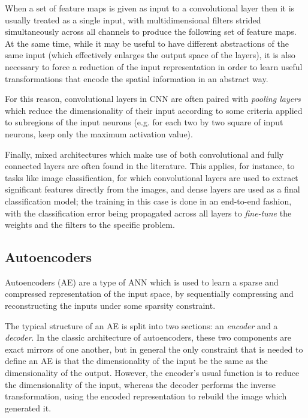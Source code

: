 When a set of feature maps is given as input to a convolutional layer then it is
usually treated as a single input, with multidimensional filters strided 
simultaneously across all channels to produce the following set of feature maps. \\

At the same time, while it may be useful to have different abstractions of the
same input (which effectively enlarges the output space of the layers), it is
also necessary to force a reduction of the input representation in order to 
learn useful transformations that encode the spatial information in an abstract 
way. 

For this reason, convolutional layers in CNN are often paired with 
\textit{pooling layers} which reduce the dimensionality of their input according
to some criteria applied to subregions of the input neurons (e.g. for each two by
two square of input neurons, keep only the maximum activation value). 

Finally, mixed architectures which make use of both convolutional and fully
connected layers are often found in the literature. This applies, for instance, 
to tasks like image classification, for which convolutional layers are used to 
extract significant features directly from the images, and dense layers are used
as a final classification model; the training in this case is done in an 
end-to-end fashion, with the classification error being propagated across all 
layers to \textit{fine-tune} the weights and the filters to the specific problem.

\subsection{Autoencoders}
Autoencoders (AE) are a type of ANN which is used to learn a sparse and compressed 
representation of the input space, by sequentially compressing and 
reconstructing the inputs under some sparsity constraint.

The typical structure of an AE is split into two sections: an 
\textit{encoder} and a \textit{decoder}. In the classic architecture of 
autoencoders, these two components are exact mirrors of one another, but in 
general the only constraint that is needed to define an AE is that
the dimensionality of the input be the same as the dimensionality of the output.
However, the encoder's usual function is to reduce the dimensionality of the 
input, whereas the decoder performs the inverse transformation, using the 
encoded representation to rebuild the image which generated it. \\

